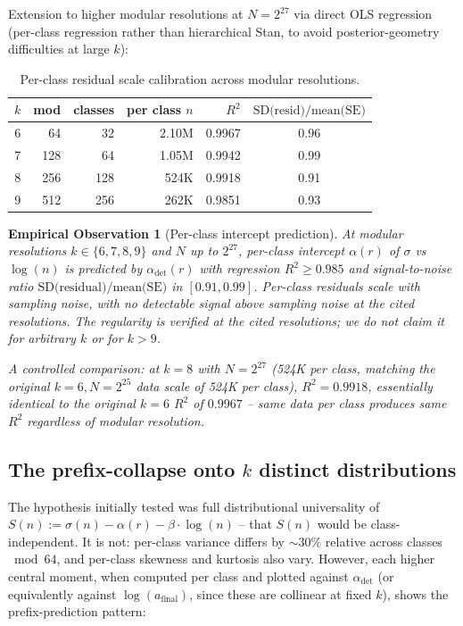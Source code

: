 \documentclass{article}
\newtheorem{observation}[theorem]{Empirical Observation}
\theoremstyle{plain}
\begin{document}
Extension to higher modular resolutions at $N=2^{27}$ via direct OLS regression (per-class regression rather than hierarchical Stan, to avoid posterior-geometry difficulties at large $k$):

\begin{table}[ht]
\centering
\caption{Per-class residual scale calibration across modular resolutions.}
\label{tab:residual-calibration}
\begin{tabular}{rrrrrc}
\hline
$k$ & mod & classes & per class $n$ & $R^2$ & $\text{SD(resid)} / \text{mean(SE)}$ \\
\hline
6 & 64 & 32 & 2.10M & 0.9967 & 0.96 \\
7 & 128 & 64 & 1.05M & 0.9942 & 0.99 \\
8 & 256 & 128 & 524K & 0.9918 & 0.91 \\
9 & 512 & 256 & 262K & 0.9851 & 0.93 \\
\hline
\end{tabular}
\end{table}

\begin{observation}[Per-class intercept prediction]
\label{obs:intercept}
At modular resolutions $k \in \{6, 7, 8, 9\}$ and $N$ up to $2^{27}$, per-class intercept $\alpha(r)$ of $\sigma$ vs $\log(n)$ is predicted by $\alpha_{\text{det}}(r)$ with regression $R^2 \geq 0.985$ and signal-to-noise ratio $\text{SD(residual)}/ \text{mean(SE)}$ in $[0.91, 0.99]$. Per-class residuals scale with sampling noise, with no detectable signal above sampling noise at the cited resolutions. The regularity is verified at the cited resolutions; we do not claim it for arbitrary $k$ or for $k > 9$.

A controlled comparison: at $k=8$ with $N = 2^{27}$ (524K per class, matching the original $k=6, N=2^{25}$ data scale of 524K per class), $R^2 = 0.9918$, essentially identical to the original $k=6$ $R^2$ of $0.9967$ -- same data per class produces same $R^2$ regardless of modular resolution.
\end{observation}

\subsection{The prefix-collapse onto $k$ distinct distributions}
The hypothesis initially tested was full distributional universality of $S(n) := \sigma(n) - \alpha(r) - \beta \cdot \log(n)$ -- that $S(n)$ would be class-independent. It is not: per-class variance differs by $\sim30\%$ relative across classes $\bmod 64$, and per-class skewness and kurtosis also vary. However, each higher central moment, when computed per class and plotted against $\alpha_{\text{det}}$ (or equivalently against $\log(a_{\text{final}})$, since these are collinear at fixed $k$), shows the prefix-prediction pattern:
\end{document}
